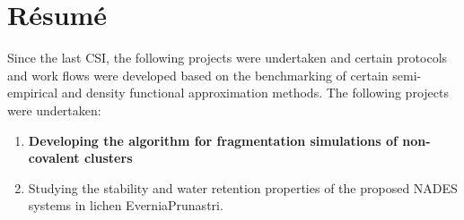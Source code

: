 \section{Résumé}
\label{sec:summary}

Since the last CSI, the following projects were undertaken and certain protocols and work flows were developed based on the benchmarking of certain semi-empirical and density functional approximation methods. 
The following projects were undertaken:
\begin{enumerate}
    \item \textbf{Developing the algorithm for fragmentation simulations of non-covalent clusters}
    \item Studying the stability and water retention properties of the proposed NADES systems in lichen EverniaPrunastri.
\end{enumerate}